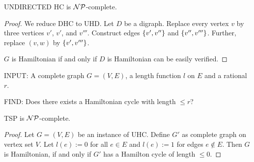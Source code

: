 \begin{thm}
UNDIRECTED HC is $\mathcal{NP}$-complete.
\end{thm}

\begin{proof}
	We reduce DHC to UHD. Let $D$ be a digraph. Replace every vertex $v$ by three vertices $v'$, $v'$, and $v'''$. Construct edges $\left\{v',v''\right\}$ and $\left\{v'', v'''\right\}$.	Further, replace $(v,w)$ by $\left\{v',v'''\right\}$.
	
	$G$ is Hamiltonian if and only if $D$ is Hamiltonian can be easily verified.
\end{proof}


INPUT: A complete graph $G = (V,E)$, a length function $l$ on $E$ and a rational $r$.

FIND: Does there exists a Hamiltonian cycle with length $\leq r$?

\begin{thm}
	TSP is $\mathcal{NP}$-complete.
\end{thm}

\begin{proof}
	Let $G = (V,E)$ be an instance of UHC. Define $G'$ as complete graph on vertex set $V$. Let $l(e):=0$ for all $e\in E$ and $l(e):=1$ for edges $e\not \in E$. Then $G$ is Hamiltonian, if and only if $G'$ has a Hamilton cycle of length $\leq 0$.
\end{proof}

